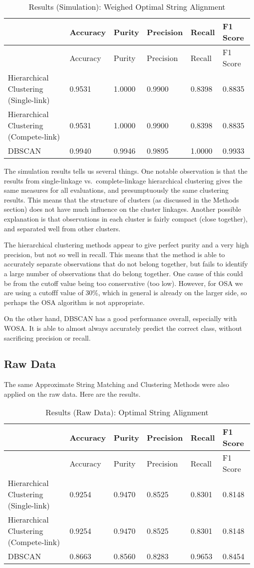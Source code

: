 \documentclass[]{article}
\begin{document}
\begin{longtable}[]{@{}llllll@{}}
\caption{Results (Simulation): Weighed Optimal String
Alignment}\tabularnewline
\toprule
& Accuracy & Purity & Precision & Recall & F1 Score\tabularnewline
\midrule
\endfirsthead
\toprule
& Accuracy & Purity & Precision & Recall & F1 Score\tabularnewline
\midrule
\endhead
Hierarchical Clustering (Single-link) & 0.9531 & 1.0000 & 0.9900 &
0.8398 & 0.8835\tabularnewline
Hierarchical Clustering (Compete-link) & 0.9531 & 1.0000 & 0.9900 &
0.8398 & 0.8835\tabularnewline
DBSCAN & 0.9940 & 0.9946 & 0.9895 & 1.0000 & 0.9933\tabularnewline
\bottomrule
\end{longtable}

The simulation results tells us several things. One notable observation
is that the results from single-linkage vs.~complete-linkage
hierarchical clustering gives the same measures for all evaluations, and
presumptuously the same clustering results. This means that the
structure of clusters (as discussed in the Methods section) does not
have much influence on the cluster linkages. Another possible
explanation is that observations in each cluster is fairly compact
(close together), and separated well from other clusters.

The hierarchical clustering methods appear to give perfect purity and a
very high precision, but not so well in recall. This means that the
method is able to accurately separate observations that do not belong
together, but fails to identify a large number of observations that do
belong together. One cause of this could be from the cutoff value being
too conservative (too low). However, for OSA we are using a cutofff
value of 30\%, which in general is already on the larger side, so
perhaps the OSA algorithm is not appropriate.

On the other hand, DBSCAN has a good performance overall, especially
with WOSA. It is able to almost always accurately predict the correct
class, without sacrificing precision or recall.

\subsection{Raw Data}\label{raw-data-1}

The same Approximate String Matching and Clustering Methods were also
applied on the raw data. Here are the results.

\begin{longtable}[]{@{}llllll@{}}
\caption{Results (Raw Data): Optimal String Alignment}\tabularnewline
\toprule
& Accuracy & Purity & Precision & Recall & F1 Score\tabularnewline
\midrule
\endfirsthead
\toprule
& Accuracy & Purity & Precision & Recall & F1 Score\tabularnewline
\midrule
\endhead
Hierarchical Clustering (Single-link) & 0.9254 & 0.9470 & 0.8525 &
0.8301 & 0.8148\tabularnewline
Hierarchical Clustering (Compete-link) & 0.9254 & 0.9470 & 0.8525 &
0.8301 & 0.8148\tabularnewline
DBSCAN & 0.8663 & 0.8560 & 0.8283 & 0.9653 & 0.8454\tabularnewline
\bottomrule
\end{longtable}
\end{document}
